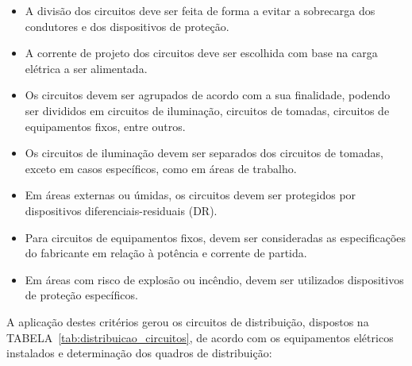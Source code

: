 \begin{itemize}
	\item A divisão dos circuitos deve ser feita de forma a evitar a sobrecarga dos condutores e dos dispositivos de proteção.
	
	\item A corrente de projeto dos circuitos deve ser escolhida com base na carga elétrica a ser alimentada.
	
	\item Os circuitos devem ser agrupados de acordo com a sua finalidade, podendo ser divididos em circuitos de iluminação, circuitos de tomadas, circuitos de equipamentos fixos, entre outros.
	
	\item Os circuitos de iluminação devem ser separados dos circuitos de tomadas, exceto em casos específicos, como em áreas de trabalho.
	
	\item Em áreas externas ou úmidas, os circuitos devem ser protegidos por dispositivos diferenciais-residuais (DR).
	
	\item Para circuitos de equipamentos fixos, devem ser consideradas as especificações do fabricante em relação à potência e corrente de partida.
	
	\item Em áreas com risco de explosão ou incêndio, devem ser utilizados dispositivos de proteção específicos.
	
\end{itemize}


A aplicação destes critérios gerou os circuitos de distribuição, dispostos na TABELA~\ref{tab:distribuicao_circuitos}, de acordo com os equipamentos elétricos instalados e determinação dos quadros de distribuição:


